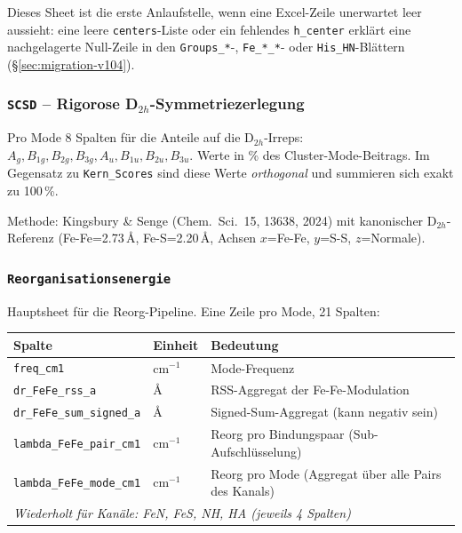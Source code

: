 \documentclass[11pt,a4paper,twoside]{article}
\providecommand{\angstrom}{\text{\AA}}    %
\theoremstyle{remark}
\begin{document}
Dieses Sheet ist die erste Anlaufstelle, wenn eine Excel-Zeile
unerwartet leer aussieht: eine leere \texttt{centers}-Liste oder ein
fehlendes \texttt{h\_center} erkl\"art eine nachgelagerte
Null-Zeile in den \texttt{Groups\_*}-, \texttt{Fe\_*\_*}- oder
\texttt{His\_HN}-Bl\"attern (\S\ref{sec:migration-v104}).

\subsubsection*{\texttt{SCSD} -- Rigorose D$_{2h}$-Symmetriezerlegung}

Pro Mode 8 Spalten f\"ur die Anteile auf die D$_{2h}$-Irreps:
$A_g, B_{1g}, B_{2g}, B_{3g}, A_u, B_{1u}, B_{2u}, B_{3u}$. Werte
in \% des Cluster-Mode-Beitrags. Im Gegensatz zu \texttt{Kern\_Scores}
sind diese Werte \emph{orthogonal} und summieren sich exakt zu 100\,\%.

Methode: Kingsbury \& Senge (Chem.\ Sci.\ 15, 13638, 2024) mit
kanonischer D$_{2h}$-Referenz (Fe-Fe=2.73\,$\angstrom$,
Fe-S=2.20\,$\angstrom$, Achsen $x$=Fe-Fe, $y$=S-S, $z$=Normale).

\subsubsection*{\texttt{Reorganisationsenergie}}
\label{app:sheet-reorg}

Hauptsheet f\"ur die Reorg-Pipeline. Eine Zeile pro Mode, 21 Spalten:

\begin{center}
\small
\begin{tabular}{p{4.0cm}p{1.4cm}p{7.6cm}}
\toprule
\textbf{Spalte} & \textbf{Einheit} & \textbf{Bedeutung} \\
\midrule
\texttt{freq\_cm1}                  & cm$^{-1}$ & Mode-Frequenz \\
\texttt{dr\_FeFe\_rss\_a}           & $\angstrom$ & RSS-Aggregat
                                                    der Fe-Fe-Modulation \\
\texttt{dr\_FeFe\_sum\_signed\_a}   & $\angstrom$ & Signed-Sum-Aggregat
                                                    (kann negativ sein) \\
\texttt{lambda\_FeFe\_pair\_cm1}    & cm$^{-1}$ & Reorg pro Bindungspaar
                                                  (Sub-Aufschl\"usselung) \\
\texttt{lambda\_FeFe\_mode\_cm1}    & cm$^{-1}$ & Reorg pro Mode
                                                  (Aggregat \"uber alle
                                                  Pairs des Kanals) \\
\midrule
\multicolumn{3}{l}{\textit{Wiederholt f\"ur Kan\"ale: FeN, FeS, NH, HA
       (jeweils 4 Spalten)}} \\
\bottomrule
\end{tabular}
\end{center}
\end{document}
